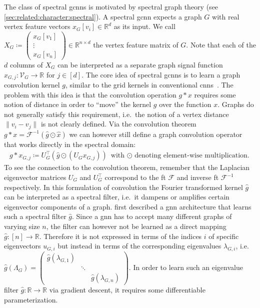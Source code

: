 The class of spectral \acp{gcnn} is motivated by spectral graph theory (see \cref{sec:related:character:spectral}).
A spectral \ac{gcnn} expects a graph $G$ with real vertex feature vectors $x_G[v_i] \in \mathbb{R}^d$ as its input.
We call $X_G \coloneqq \begin{pmatrix} x_G[v_1] \\ \vdots \\ x_G[v_n] \end{pmatrix} \in \mathbb{R}^{n \times d}$ the vertex feature matrix of $G$.
Note that each of the $d$ columns of $X_G$ can be interpreted as a separate graph signal function $x_{G,j}: \mathcal{V}_G \to \mathbb{R}$ for $j \in [d]$.
The core idea of spectral \acp{gcnn} is to learn a graph convolution kernel $g$, similar to the grid kernels in conventional \acp{cnn}~\cite{LeCun1998}.
The problem with this idea is that the convolution operation $g * x$ requires some notion of distance in order to ``move'' the kernel $g$ over the function $x$.
Graphs do not generally satisfy this requirement, i.e.\ the notion of a vertex distance $\|v_i - v_j\|$ is not clearly defined.
Via the convolution theorem $g * x = \mathcal{F}^{-1}(\hat{g} \odot \hat{x})$ we can however still define a graph convolution operator that works directly in the spectral domain:
\begin{align}
	g * x_{G,j} \coloneqq U_G^{\top} (\hat{g} \odot (U_G x_{G,j}))
	\text{ with $\odot$ denoting element-wise multiplication.}
\end{align}
To see the connection to the convolution theorem, remember that the Laplacian eigenvector matrices $U_G$ and $U_G^{\top}$ correspond to the \ac{ft} $\mathcal{F}$ and inverse \ac{ft} $\mathcal{F}^{-1}$ respectively.
In this formulation of convolution the Fourier transformed kernel $\hat{g}$ can be interpreted as a spectral filter, i.e.\ it dampens or amplifies certain eigenvector components of a graph.
\citet{Bruna2013}\cite{Henaff2015} first described a \ac{gnn} architecture that learns such a spectral filter $\hat{g}$.
Since a \ac{gnn} has to accept many different graphs of varying size $n$, the filter can however not be learned as a direct mapping $\hat{g}: [n] \to \mathbb{R}$.
Therefore it is not expressed in terms of the indices $i$ of specific eigenvectors $u_{G,i}$ but instead in terms of the corresponding eigenvalues $\lambda_{G,i}$, i.e.\ $\hat{g}(\Lambda_G) = \begin{pmatrix} \hat{g}(\lambda_{G,1}) & & \\ & \ddots & \\ & & \hat{g}(\lambda_{G,n}) \end{pmatrix}$.
In order to learn such an eigenvalue filter $\hat{g}: \mathbb{R} \to \mathbb{R}$ via gradient descent, it requires some differentiable parameterization.

